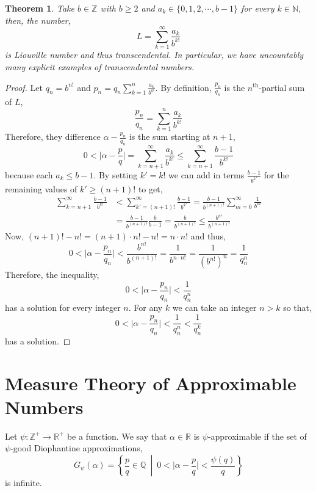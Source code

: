 \documentclass{article}
\newcommand{\Z}{\mathbb{Z}}
\newcommand{\N}{\mathbb{N}}
\newcommand{\Zplus}{\mathbb{Z}^{+}}
\newcommand{\Q}{\mathbb{Q}}
\newcommand{\R}{\mathbb{R}}
\newcommand{\Rplus}{\mathbb{R}^+}
\newenvironment{definition}[1][Definition:]{\begin{trivlist}
\item[\hskip \labelsep {\bfseries #1}]}{\end{trivlist}}
\theoremstyle{theorem}
\newtheorem{theorem}{Theorem}[section]
\theoremstyle{definition}
\theoremstyle{definition}
\theoremstyle{remark}
\theoremstyle{definition}
\theoremstyle{remark}
\begin{document}
\begin{theorem}
Take $b \in \Z$ with $b \ge 2$ and $a_k \in \{0, 1, 2, \cdots, b - 1\}$ for every $k \in \N$, then, the number,
\[L = \sum_{k = 1}^\infty \frac{a_k}{b^{k!}}\] is Liouville number and thus transcendental. In particular, we have uncountably many explicit examples of transcendental numbers. 
\end{theorem}

\begin{proof}
Let $q_n = b^{n!}$ and $p_n = q_n \sum\limits_{k = 1}^n \frac{a_k}{b^{k!}}$. By definition, $\frac{p_n}{q_n}$ is the $n^{\text{th}}$-partial sum of $L$,
\[ \frac{p_n}{q_n} = \sum\limits_{k = 1}^n \frac{a_k}{b^{k!}} \]
Therefore, they difference $\alpha - \frac{p_n}{q_n}$ is the sum starting at $n + 1$,
\[ 0 < \Big| \alpha - \frac{p}{q} \Big| = \sum_{k = n + 1}^\infty \frac{a_k}{b^{k!}} \le \sum_{k = n + 1}^\infty \frac{b-1}{b^{k!}} \]
because each $a_k \le b-1$. By setting $k' = k!$ we can add in terms $\frac{b-1}{b^{k'}}$ for the remaining values of $k' \ge (n + 1)!$ to get, 
\begin{align*}
\sum_{k = n + 1}^\infty \frac{b-1}{b^{k!}} & < \sum_{k' = (n+1)!}^{\infty} \frac{b-1}{b^{k'}} = \frac{b-1}{b^{(n+1)!}} \sum_{m = 0}^\infty \frac{1}{b^m}
\\
& = \frac{b - 1}{b^{(n+1)!}} \frac{b}{b-1} = \frac{b}{b^{(n+1)!}} \le \frac{b^{n!}}{b^{(n+1)!}}
\end{align*}
Now, $(n+1)! - n! = (n+1) \cdot n! - n! = n \cdot n!$ and thus,
\[ 0 < \Big| \alpha - \frac{p_n}{q_n} \Big| < \frac{b^{n!}}{b^{(n+1)!}} = \frac{1}{b^{n \cdot n!}} = \frac{1}{(b^{n!})^n} = \frac{1}{q_n^n}\]
Therefore, the inequality,
\[0 < \Big| \alpha - \frac{p_n}{q_n} \Big| < \frac{1}{q_n^n}\]
has a solution for every integer $n$. For any $k$ we can take an integer $n > k$ so that,
\[0 < \Big| \alpha - \frac{p_n}{q_n} \Big| < \frac{1}{q_n^n} < \frac{1}{q_n^k}\]
has a solution.  
\end{proof}


\section{Measure Theory of Approximable Numbers}

\begin{definition}
Let $\psi : \Zplus \to \Rplus$ be a function. We say that $\alpha \in \R$ is $\psi$-approximable if the set of $\psi$-good Diophantine approximations,
\[ G_\psi(\alpha) = \left\{ \frac{p}{q} \in \Q \: \middle| \: 0 < \Big|\alpha - \frac{p}{q} \Big| < \frac{\psi(q)}{q} \right\} \]
is infinite. 
\end{definition}
\end{document}
